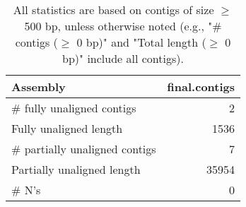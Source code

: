 \documentclass[12pt,a4paper]{article}
\begin{document}
\begin{table}[ht]
\begin{center}
\caption{All statistics are based on contigs of size $\geq$ 500 bp, unless otherwise noted (e.g., "\# contigs ($\geq$ 0 bp)" and "Total length ($\geq$ 0 bp)" include all contigs).}
\begin{tabular}{|l*{1}{|r}|}
\hline
Assembly & final.contigs \\ \hline
\# fully unaligned contigs & 2 \\ \hline
Fully unaligned length & 1536 \\ \hline
\# partially unaligned contigs & 7 \\ \hline
Partially unaligned length & 35954 \\ \hline
\# N's & 0 \\ \hline
\end{tabular}
\end{center}
\end{table}
\end{document}
